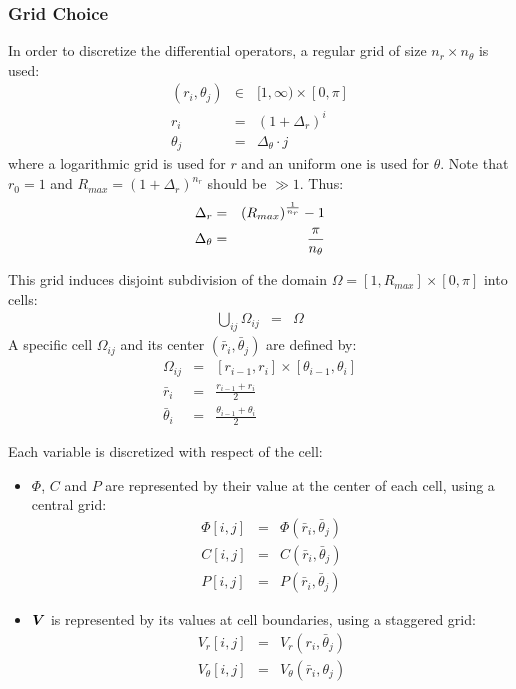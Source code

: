 \subsubsection{Grid Choice}
In order to discretize the differential operators, 
a regular grid of size $n_r \times n_\theta$ is used:
\begin{eqnarray}
(r_i,\theta_j) &\in& [1, \infty) \times [0,\pi] \\ 
r_i &=& (1+\Delta_r)^i \\
\theta_j &=& \Delta_\theta \cdot j
\end{eqnarray}
where a logarithmic grid is used for $r$ and an uniform one is used for $\theta$.
Note that $r_0 = 1$ and $R_{max} = (1+\Delta_r)^{n_r}$ should be $\gg 1$. Thus:
\begin{eqnarray}
\Delta_r &=& \left(R_{max}\right) ^ \frac{1}{n_r} - 1 \\
\Delta_\theta &=& \frac{\pi}{n_\theta}
\end{eqnarray}

This grid induces disjoint subdivision of the domain 
$\Omega = [1, R_{max}] \times [0,\pi]$ into cells:
\begin{eqnarray}
\bigcup_{ij}\Omega_{ij} &=& \Omega
\end{eqnarray}
A specific cell $\Omega_{ij}$ and its center $(\bar{r}_i, \bar{\theta}_j)$ are defined by:
\begin{eqnarray}
\Omega_{ij} &=& [r_{i-1}, r_{i}] \times [\theta_{i-1}, \theta_{i}] \\
\bar{r}_i &=& \frac{r_{i-1} + r_{i}}{2} \\
\bar{\theta}_i &=& \frac{\theta_{i-1} + \theta_{i}}{2}
\end{eqnarray}

Each variable is discretized with respect of the cell:
\begin{itemize}
\item $\varPhi$, $C$ and $P$ are represented by their value at the center of each cell, 
using a central grid:
\begin{eqnarray}
\varPhi[i,j] &=& \varPhi(\bar{r}_i, \bar{\theta}_j) \\
C[i,j] &=& C(\bar{r}_i, \bar{\theta}_j) \\
P[i,j] &=& P(\bar{r}_i, \bar{\theta}_j) 
\end{eqnarray}
\item $\boldsymbol{V}$ is represented by its values at cell boundaries, using a staggered grid:
\begin{eqnarray}
V_r[i,j] &=& V_r(r_i, \bar{\theta}_j) \\
V_\theta[i,j] &=& V_\theta(\bar{r}_i, {\theta}_j)
\end{eqnarray}
\end{itemize}

